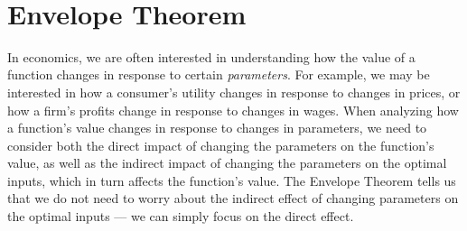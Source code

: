 \documentclass{./../Latex/handout}
\begin{document}
 \\


\section{Envelope Theorem}

In economics, we are often interested in understanding how the value of a function changes in response to certain \textit{parameters}. For example, we may be interested in how a consumer's utility changes in response to changes in prices, or how a firm's profits change in response to changes in wages. When analyzing how a function's value changes in response to changes in parameters, we need to consider both the direct impact of changing the parameters on the function's value, as well as the indirect impact of changing the parameters on the optimal inputs, which in turn affects the function's value. The Envelope Theorem tells us that we do not need to worry about the indirect effect of changing parameters on the optimal inputs --- we can simply focus on the direct effect. \\

 \\
\end{document}
